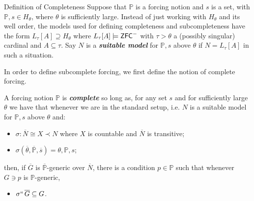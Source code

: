 \documentclass[utf8x,xcolor=svgnames,8pt]{beamer}
\renewcommand{\P}{\mathbb{P}}
\newcommand{\N}{{\overline{N}}}
\renewcommand{\G}{\overline{G}}
\newcommand{\ZFC}{\textup{\ensuremath{\textsf{ZFC}}}}
\begin{document}
\begin{frame}{Definition of Completeness}
Suppose that $\P$ is a forcing notion and $s$ is a set, with $\P, s \in H_\theta$, where $\theta$ is sufficiently large. Instead of just working with $H_\theta$ and its well order, the models used for defining completeness and subcompleteness have the form $L_\tau[A] \supseteq H_\theta$ where $L_\tau[A] \models \ZFC^-$ with $\tau>\theta$ a (possibly singular) cardinal and $A \subseteq \tau$. Say $N$ is a \emph{\textbf{suitable model}} for $\P,s$ above $\theta$ if $N=L_\tau[A]$ in such a situation.

In order to define subcomplete forcing, we first define the notion of complete forcing.
\begin{definition}
A forcing notion $\P$ is \emph{\textbf{complete}} so long as, for any set $s$ and for sufficiently large $\theta$ we have that whenever we are in the standard setup, i.e. $N$ is a suitable model for $\P,s$ above $\theta$ and: \begin{itemize}
	\item $\sigma: \N \cong X \prec N$ where $X$ is countable and $\N$ is transitive;
	\item $\sigma(\overline \theta, \overline{\P}, \overline s)=\theta, \P, s$;
\end{itemize}
then, if $\overline G$ is $\overline{\P}$-generic over $\N$, there is a condition $p \in \P$ such that whenever $G \ni p$ is $\P$-generic, 
\begin{itemize}
	\item $\sigma ``\, \G \subseteq G$. 
\end{itemize}


\end{definition}
\end{frame}
\end{document}
